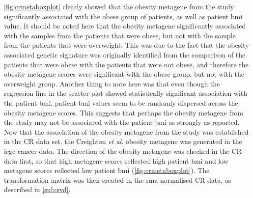 \cref{fig:crmetaboxplot} clearly showed that the obesity metagene from the \citet{Creighton2012} study significantly associated with the obese group of patients, as well as patient \gls{bmi} value.
It should be noted here that the obesity metagene significantly associated with the samples from the patients that were obese, but not with the sample from the patients that were overweight.
This was due to the fact that the obesity associated genetic signature was originally identified from the comparison of the patients that were obese with the patients that were not obese, and therefore the obesity metagene scores were significant with the obese group, but not with the overweight group.
Another thing to note here was that even though  the regression line in the scatter plot showed statistically significant association with the patient \gls{bmi}, patient \gls{bmi} values seem to be randomly dispersed across the obesity metagene scores.
This suggests that perhaps the obesity metagene from the \citet{Creighton2012} study may not be associated with the patient \gls{bmi} as strongly as reported.
\\

\noindent
Now that the association of the obesity metagene from the \citet{Creighton2012} study was established in the CR data set, the Creighton \textit{et al.} obesity metagene was generated in the \gls{icgc} cancer data.
The direction of the obesity metagene was checked in the CR data first, so that high metagene scores reflected high patient \gls{bmi} and low metagene scores reflected low patient \gls{bmi} (\cref{fig:crmetaboxplot}).
The transformation matrix was then created in the \gls{rma} normalised CR data, as described in \cref{sub:svd}.


